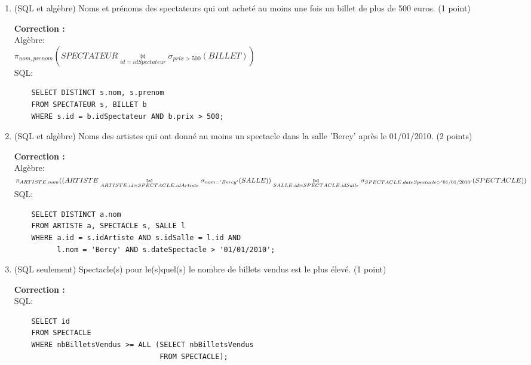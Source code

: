 \documentclass[10pt]{article}
\newenvironment{solution}{\vspace{6pt}\noindent\color{red}\textbf{Correction : }}{\vspace{6pt}\ignorespacesafterend}
\begin{document}
\begin{enumerate}

\item (SQL et algèbre) Noms et prénoms des spectateurs qui ont acheté au moins une fois un billet de plus de 500 euros. (1 point)

\begin{solution}\\
Algèbre:\\
    $\pi_{nom, prenom}(SPECTATEUR \underset{id=idSpectateur}{\bowtie} \sigma_{prix > 500}(BILLET))$
\vspace{10pt}\\
SQL:
\begin{verbatim}
    SELECT DISTINCT s.nom, s.prenom
    FROM SPECTATEUR s, BILLET b
    WHERE s.id = b.idSpectateur AND b.prix > 500;
\end{verbatim}
\end{solution}

\item (SQL et algèbre) Noms des artistes qui ont donné au moins un spectacle dans la salle 'Bercy' après le 01/01/2010. (2 points)

\begin{solution}\\
Algèbre:\\
	$\pi_{ARTISTE.nom}((ARTISTE \underset{ARTISTE.id=SPECTACLE.idArtiste}{\bowtie} \sigma_{nom = 'Bercy'}(SALLE))\\ \underset{SALLE.id=SPECTACLE.idSalle}{\bowtie} \sigma_{SPECTACLE.dateSpectacle > '01/01/2010'}(SPECTACLE))$
\vspace{10pt}\\
SQL:
   \begin{verbatim}
    SELECT DISTINCT a.nom
    FROM ARTISTE a, SPECTACLE s, SALLE l
    WHERE a.id = s.idArtiste AND s.idSalle = l.id AND
          l.nom = 'Bercy' AND s.dateSpectacle > '01/01/2010';
\end{verbatim}
\end{solution}

\item (SQL seulement) Spectacle(s) pour le(s)quel(s) le nombre de billets vendus est le plus élevé. (1 point)

\begin{solution}\\
	SQL:
    \begin{verbatim}
    SELECT id
    FROM SPECTACLE
    WHERE nbBilletsVendus >= ALL (SELECT nbBilletsVendus
                                  FROM SPECTACLE);
    \end{verbatim}
\end{solution}


\end{enumerate}
\end{document}
